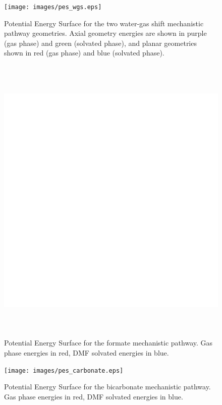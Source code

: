 \begin{landscape}
\begin{figure}[!htbp]
 \begin{center}
  \texttt{[image: images/pes\_wgs.eps]}
 \end{center}
\caption[Potential Energy Surface for the two water-gas shift mechanistic pathway geometries.]{Potential Energy Surface for the two water-gas shift mechanistic pathway geometries. Axial geometry energies are shown in purple (gas phase) and green (solvated phase), and planar geometries shown in red (gas phase) and blue (solvated phase).}
\label{fig.apes_wgs}
\end{figure} 

\begin{figure}[!htbp]
 \begin{center}
  \includegraphics[clip=true, height=142mm, keepaspectratio]{images/pes_formate.eps}
 \end{center}
\caption[Potential Energy Surface for the formate mechanistic pathway.]{Potential Energy Surface for the formate mechanistic pathway. Gas phase energies in red, DMF solvated energies in blue.}
\label{fig.apes_formate}
\end{figure} 

\begin{figure}[!htbp]
 \begin{center}
  \texttt{[image: images/pes\_carbonate.eps]}
 \end{center}
\caption[Potential Energy Surface for the bicarbonate mechanistic pathway.]{Potential Energy Surface for the bicarbonate mechanistic pathway. Gas phase energies in red, DMF solvated energies in blue.}
\label{fig.apes_carbonate}


\end{figure}
\end{landscape}
